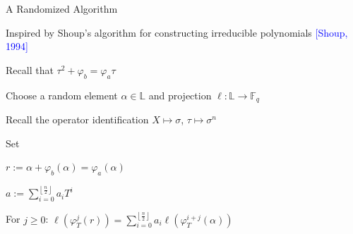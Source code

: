 \documentclass{beamer}
\newcommand{\f}{\mathbb{F}}
\newcommand{\blue}{\textcolor{blue}}
\newcommand{\spa}{\vspace{0.2cm}}
\begin{document}
\begin{frame}{A Randomized Algorithm}


     Inspired by Shoup's algorithm for constructing irreducible polynomials \blue{[Shoup, 1994]}  
     
     \spa
     
    \item Recall that $\tau^2 + \varphi_b = \varphi_a \tau$
    
    
    \item Choose a random element $\alpha \in \mathbb{L}$ and projection $\ell : \mathbb{L} \to \f_q$
    \item Recall the operator identification $X \mapsto \sigma$, $\tau \mapsto \sigma^n$
    \item Set
    \item \centerline{$r := \alpha + \varphi_b(\alpha) = \varphi_a(\alpha)$}
    \item \centerline{$a := \sum_{i=0}^{\left\lfloor \frac{n}{2} \right\rfloor}a_iT^i$}
    
    \item For $j \geq 0$: $\ell(\varphi_T^j(r)) = \sum_{i = 0}^{\left\lfloor{\frac{n}{2}} \right\rfloor}a_i\ell(\varphi_T^{i+j}(\alpha))$
 
    
    \end{frame}
    
\end{document}
